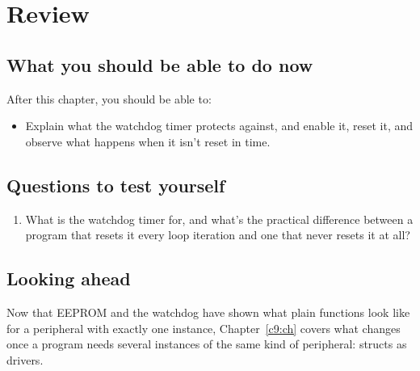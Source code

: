 
\section{Review}
\label{c8:sec:review}

\subsection*{What you should be able to do now}
After this chapter, you should be able to:
\begin{itemize}
  \item Explain what the watchdog timer protects against, and enable it, reset it, and observe
    what happens when it isn't reset in time.
\end{itemize}

\subsection*{Questions to test yourself}
\begin{enumerate}
  \item What is the watchdog timer for, and what's the practical difference between a program that
    resets it every loop iteration and one that never resets it at all?
\end{enumerate}

\subsection*{Looking ahead}
Now that EEPROM and the watchdog have shown what plain functions look like for a peripheral with
exactly one instance, Chapter~\ref{c9:ch} covers what changes once a program needs several
instances of the same kind of peripheral: structs as drivers.
